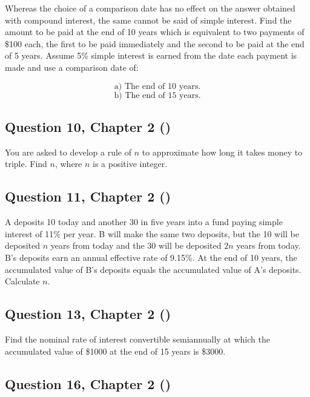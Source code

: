 \documentclass[12pt, a4paper]{article}
\begin{document}
\noindent Whereas the choice of a comparison date has no effect on the answer obtained with compound interest, the same cannot be said of simple interest. Find the amount to be paid at the end of 10 years which is equivalent to two payments of \$100 each, the first to be paid immediately and the second to be paid at the end of 5 years. Assume 5\% simple interest is earned from the date each payment is made and use a comparison date of:

\[
\text{a) The end of 10 years.}
\]
\[
\text{b) The end of 15 years.}
\]

\bigskip



\subsection*{Question 10, Chapter 2 (\cite{toi3rd})}

\noindent You are asked to develop a rule of \( n \) to approximate how long it takes money to triple. Find \( n \), where \( n \) is a positive integer.

\bigskip



\subsection*{Question 11, Chapter 2 (\cite{toi3rd})}

\noindent A deposits 10 today and another 30 in five years into a fund paying simple interest of 11\% per year. B will make the same two deposits, but the 10 will be deposited \( n \) years from today and the 30 will be deposited \( 2n \) years from today. B’s deposits earn an annual effective rate of 9.15\%. At the end of 10 years, the accumulated value of B’s deposits equals the accumulated value of A’s deposits. Calculate \( n \).

\bigskip


\subsection*{Question 13, Chapter 2 (\cite{toi3rd})}

\noindent Find the nominal rate of interest convertible semiannually at which the accumulated value of \$1000 at the end of 15 years is \$3000.

\bigskip



\subsection*{Question 16, Chapter 2 (\cite{toi3rd})}
\end{document}
